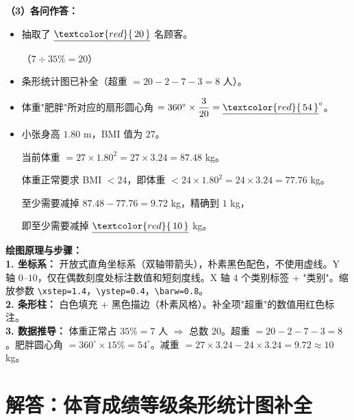 \vspace{0.4cm}
\textbf{（3）各问作答：}

\begin{itemize}
    \item[\textbf{(1)}] 抽取了 $\underline{\textcolor{red}{\,20\,}}$ 名顾客。

    （$7 \div 35\% = 20$）

    \item[\textbf{(2)}] 条形统计图已补全（超重 $= 20 - 2 - 7 - 3 = 8$ 人）。

    \item[\textbf{(3)}] 体重"肥胖"所对应的扇形圆心角 $= 360^\circ \times \dfrac{3}{20} = \underline{\textcolor{red}{\,54\,}}^\circ$。

    \item[\textbf{(4)}] 小张身高 $1.80$ m，BMI 值为 $27$。

    当前体重 $= 27 \times 1.80^2 = 27 \times 3.24 = 87.48$ kg。

    体重正常要求 BMI $< 24$，即体重 $< 24 \times 1.80^2 = 24 \times 3.24 = 77.76$ kg。

    至少需要减掉 $87.48 - 77.76 = 9.72$ kg，精确到 $1$ kg，

    即至少需要减掉 $\underline{\textcolor{red}{\,10\,}}$ kg。
\end{itemize}

\vspace{0.4cm}
{\small\color{blue!70!black}
\textbf{绘图原理与步骤：}\\
\textbf{1. 坐标系：} 开放式直角坐标系（双轴带箭头），朴素黑色配色，不使用虚线。Y 轴 $0$--$10$，仅在偶数刻度处标注数值和短刻度线。X 轴 4 个类别标签 + "类别"。缩放参数 \texttt{\textbackslash{}xstep=1.4}，\texttt{\textbackslash{}ystep=0.4}，\texttt{\textbackslash{}barw=0.8}。\\
\textbf{2. 条形柱：} 白色填充 + 黑色描边（朴素风格）。补全项"超重"的数值用红色标注。\\
\textbf{3. 数据推导：} 体重正常占 $35\% = 7$ 人 $\Rightarrow$ 总数 $20$。超重 $= 20 - 2 - 7 - 3 = 8$。肥胖圆心角 $= 360^\circ \times 15\% = 54^\circ$。减重 $= 27 \times 3.24 - 24 \times 3.24 = 9.72 \approx 10$ kg。
}

\newpage



\section{解答：体育成绩等级条形统计图补全}

